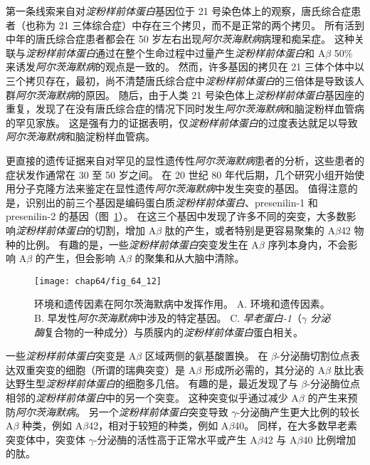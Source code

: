 第一条线索来自对\textit{淀粉样前体蛋白}基因位于 21 号染色体上的观察，唐氏综合症患者（也称为 21 三体综合症）中存在三个拷贝，而不是正常的两个拷贝。
所有活到中年的唐氏综合症患者都会在 50 岁左右出现\textit{阿尔茨海默病}病理和痴呆症。
这种关联与\textit{淀粉样前体蛋白}通过在整个生命过程中过量产生\textit{淀粉样前体蛋白}和 A$\beta$ 50\% 来诱发\textit{阿尔茨海默病}的观点是一致的。
然而，许多基因的拷贝在 21 三体个体中以三个拷贝存在，最初，尚不清楚唐氏综合症中\textit{淀粉样前体蛋白}的三倍体是导致该人群\textit{阿尔茨海默病}的原因。
随后，由于人类 21 号染色体上\textit{淀粉样前体蛋白}基因座的重复，发现了在没有唐氏综合症的情况下同时发生\textit{阿尔茨海默病}和脑淀粉样血管病的罕见家族。
这是强有力的证据表明，仅\textit{淀粉样前体蛋白}的过度表达就足以导致\textit{阿尔茨海默病}和脑淀粉样血管病。


更直接的遗传证据来自对罕见的显性遗传性\textit{阿尔茨海默病}患者的分析，这些患者的症状发作通常在 30 至 50 岁之间。
在 20 世纪 80 年代后期，几个研究小组开始使用分子克隆方法来鉴定在显性遗传\textit{阿尔茨海默病}中发生突变的基因。
值得注意的是，识别出的前三个基因是编码蛋白质\textit{淀粉样前体蛋白}、presenilin-1 和 presenilin-2 的基因（图~\ref{fig:64_12}）。
在这三个基因中发现了许多不同的突变，大多数影响\textit{淀粉样前体蛋白}的切割，增加 A$\beta$ 肽的产生，或者特别是更容易聚集的 A$\beta$42 物种的比例。
有趣的是，一些\textit{淀粉样前体蛋白}突变发生在 A$\beta$ 序列本身内，不会影响 A$\beta$ 的产生，但会影响 A$\beta$ 的聚集和从大脑中清除。


\begin{figure}[htbp]
	\centering
	\texttt{[image: chap64/fig\_64\_12]}
	\caption{环境和遗传因素在阿尔茨海默病中发挥作用。
		A. 环境和遗传因素。
		B. 早发性\textit{阿尔茨海默病}中涉及的特定基因。
		C. \textit{早老蛋白-1}（\textit{$\gamma$ 分泌酶}复合物的一种成分）与质膜内的\textit{淀粉样前体蛋白}蛋白相关。}
	\label{fig:64_12}
\end{figure}


一些\textit{淀粉样前体蛋白}突变是 A$\beta$ 区域两侧的氨基酸置换。
在 $\beta$-分泌酶切割位点表达双重突变的细胞（所谓的瑞典突变）是 A$\beta$ 形成所必需的，其分泌的 A$\beta$ 肽比表达野生型\textit{淀粉样前体蛋白}的细胞多几倍。
有趣的是，最近发现了与 $\beta$-分泌酶位点相邻的\textit{淀粉样前体蛋白}中的另一个突变。
这种突变似乎通过减少 A$\beta$ 的产生来预防\textit{阿尔茨海默病}。
另一个\textit{淀粉样前体蛋白}突变导致 $\gamma$-分泌酶产生更大比例的较长 A$\beta$ 种类，例如 A$\beta$42，相对于较短的种类，例如 A$\beta$40。
同样，在大多数早老素突变体中，突变体 $\gamma$-分泌酶的活性高于正常水平或产生 A$\beta$42 与 A$\beta$40 比例增加的肽。


